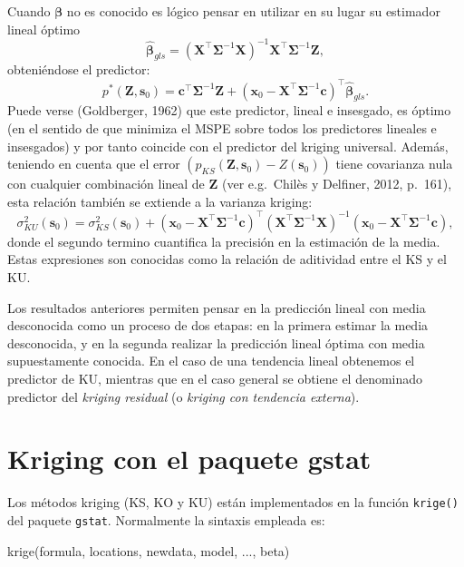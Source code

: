 \documentclass[
  spanish,
]{book}
\newenvironment{Shaded}{\begin{snugshade}}{\end{snugshade}}
\newcommand{\FunctionTok}[1]{\textcolor[rgb]{0.00,0.00,0.00}{#1}}
\newcommand{\NormalTok}[1]{#1}
\theoremstyle{break}
\theoremstyle{definition}
\theoremstyle{definition}
\theoremstyle{definition}
\theoremstyle{definition}
\theoremstyle{remark}
\begin{document}
Cuando \(\boldsymbol{\beta}\) no es conocido es lógico pensar en utilizar en su lugar su estimador lineal óptimo
\[\hat{\boldsymbol{\beta}}_{gls} =(\mathbf{X}^{\top}\boldsymbol{\Sigma}^{-1} \mathbf{X})^{-1} \mathbf{X}^{\top}\boldsymbol{\Sigma}^{-1} \mathbf{Z},\]
obteniéndose el predictor:
\[p^{\ast}(\mathbf{Z},\mathbf{s}_{0}) = \mathbf{c^\top }\boldsymbol{\Sigma}^{-1}\mathbf{Z} + (\mathbf{x}_0-\mathbf{X}^\top\boldsymbol{\Sigma}^{-1} \mathbf{c})^\top \hat{\boldsymbol{\beta}}_{gls}.\]
Puede verse (Goldberger, 1962) que este predictor, lineal e insesgado, es óptimo (en el sentido de que minimiza el MSPE sobre todos los predictores lineales e insesgados) y por tanto coincide con el predictor del kriging universal.
Además, teniendo en cuenta que el error \(\left( p_{KS} (\mathbf{Z},\mathbf{s}_{0})-Z(\mathbf{s}_{0})\right)\) tiene covarianza nula con cualquier combinación lineal de \(\mathbf{Z}\) (ver e.g.~Chilès y Delfiner, 2012, p.~161), esta relación también se extiende a la varianza kriging:
\[\sigma_{KU}^{2} (\mathbf{s}_{0})=\sigma_{KS}^{2} (\mathbf{s}_{0}
)+(\mathbf{x}_0-\mathbf{X^\top }\boldsymbol{\Sigma}^{-1} \mathbf{c})^\top \left(
\mathbf{X^\top }\boldsymbol{\Sigma}^{-1} \mathbf{X}\right)^{-1}
(\mathbf{x}_0-\mathbf{X^\top }\boldsymbol{\Sigma}^{-1} \mathbf{c}),\]
donde el segundo termino cuantifica la precisión en la estimación de la media.
Estas expresiones son conocidas como la relación de aditividad entre el KS y el KU.

Los resultados anteriores permiten pensar en la predicción lineal con media desconocida como un proceso de dos etapas: en la primera estimar la media desconocida, y en la segunda realizar la predicción lineal óptima con media supuestamente conocida.
En el caso de una tendencia lineal obtenemos el predictor de KU, mientras que en el caso general se obtiene el denominado predictor del \emph{kriging residual} (o \emph{kriging con tendencia externa}).

\hypertarget{kriging-gstat}{%
\section{\texorpdfstring{Kriging con el paquete \textbf{gstat}}{Kriging con el paquete gstat}}\label{kriging-gstat}}

Los métodos kriging (KS, KO y KU) están implementados en la función \texttt{krige()} del paquete \texttt{gstat}.
Normalmente la sintaxis empleada es:

\begin{Shaded}
\begin{Highlighting}[]
\FunctionTok{krige}\NormalTok{(formula, locations, newdata, model, ..., beta)}
\end{Highlighting}
\end{Shaded}
\end{document}
